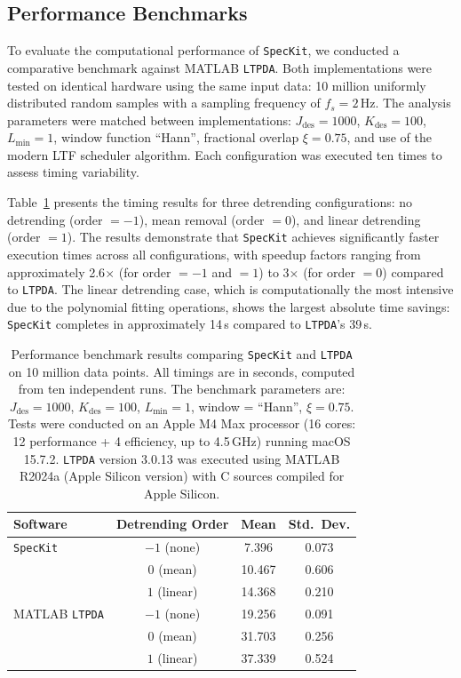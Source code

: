 \documentclass[final, 5p, times, twocolumn, number, sort&compress]{elsarticle}
\newcommand{\speckit}{\texttt{SpecKit}}
\begin{document}
\subsection{Performance Benchmarks}
\label{sec:performance}

To evaluate the computational performance of \speckit{}, we conducted a comparative benchmark against MATLAB \texttt{LTPDA}. Both implementations were tested on identical hardware using the same input data: 10 million uniformly distributed random samples with a sampling frequency of $f_s = 2$\,Hz. The analysis parameters were matched between implementations: $J_{\text{des}} = 1000$, $K_{\text{des}} = 100$, $L_{\min} = 1$, window function ``Hann'', fractional overlap $\xi = 0.75$, and use of the modern LTF scheduler algorithm. Each configuration was executed ten times to assess timing variability.

Table~\ref{tab:performance_benchmark} presents the timing results for three detrending configurations: no detrending (order $=-1$), mean removal (order $=0$), and linear detrending (order $=1$). The results demonstrate that \speckit{} achieves significantly faster execution times across all configurations, with speedup factors ranging from approximately 2.6$\times$ (for order $=-1$ and $=1$) to 3$\times$ (for order $=0$) compared to \texttt{LTPDA}. The linear detrending case, which is computationally the most intensive due to the polynomial fitting operations, shows the largest absolute time savings: \speckit{} completes in approximately 14\,s compared to \texttt{LTPDA}'s 39\,s.

\begin{table}[t!]
\centering
\caption{Performance benchmark results comparing \speckit{} and \texttt{LTPDA} on 10 million data points. All timings are in seconds, computed from ten independent runs. The benchmark parameters are: $J_{\text{des}} = 1000$, $K_{\text{des}} = 100$, $L_{\min} = 1$, window = ``Hann'', $\xi = 0.75$. Tests were conducted on an Apple M4 Max processor (16 cores: 12 performance + 4 efficiency, up to 4.5\,GHz) running macOS 15.7.2. \texttt{LTPDA} version 3.0.13 was executed using MATLAB R2024a (Apple Silicon version) with C sources compiled for Apple Silicon.}
\label{tab:performance_benchmark}
\small
\begin{tabular}{@{} l c c c @{}}
\toprule
\textbf{Software} & \textbf{Detrending Order} & \textbf{Mean} & \textbf{Std.\ Dev.} \\
\midrule
\speckit{} & $-1$ (none) & 7.396 & 0.073 \\
           & $0$ (mean)  & 10.467 & 0.606 \\
           & $1$ (linear) & 14.368 & 0.210 \\
\addlinespace
MATLAB \texttt{LTPDA} & $-1$ (none) & 19.256 & 0.091 \\
              & $0$ (mean)  & 31.703  & 0.256 \\
              & $1$ (linear) & 37.339 & 0.524  \\
\bottomrule
\end{tabular}
\end{table}
\end{document}
